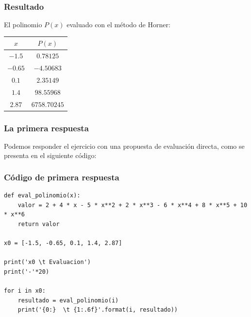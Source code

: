 \documentclass[12pt]{beamer}
\begin{document}
\begin{frame}
\frametitle{Resultado}
El polinomio $P(x)$ evaluado con el método de Horner:
\\
\medskip
\renewcommand{\arraystretch}{1}
\begin{table}
\centering
\begin{tabular}{c | c }
$x$ & $P (x)$ \\
\hline $-1.5$ & $0.78125$ \\
\hline $-0.65$ & $-4.50683$ \\
\hline $0.1$ & $2.35149$ \\
\hline $1.4$ & $98.55968$ \\
\hline $2.87$ & $6758.70245$ \\
\end{tabular}
\end{table}
\end{frame}
\begin{frame}[fragile]
\frametitle{La primera respuesta}
Podemos responder el ejercicio con una propuesta de evaluación directa, como se presenta en el siguiente código:
\end{frame}
\begin{frame}
\frametitle{Código de primera respuesta}
\begin{lstlisting}[caption=Código directo]
def eval_polinomio(x):
    valor = 2 + 4 * x - 5 * x**2 + 2 * x**3 - 6 * x**4 + 8 * x**5 + 10 * x**6
    return valor

x0 = [-1.5, -0.65, 0.1, 1.4, 2.87]

print('x0 \t Evaluacion')
print('-'*20)

for i in x0:
    resultado = eval_polinomio(i)
    print('{0:}  \t {1:.6f}'.format(i, resultado))
\end{lstlisting}
\end{frame}
\end{document}
